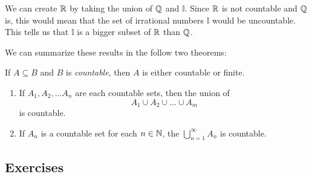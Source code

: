 We can create \( \mathbb{R} \) by taking the union of \( \mathbb{Q} \) and \( \mathbb{I} \). Since \( \mathbb{R} \) is not countable and \( \mathbb{Q} \) is, this would mean that the set of irrational numbers \( \mathbb{I}\) would be uncountable. This tells us that \( \mathbb{I}\) is a bigger subset of \( \mathbb{R} \) than \( \mathbb{Q} \). 

We can summarize these results in the follow two theorems: 


\begin{tcolorbox}
\begin{thm}
    If \( A \subseteq B \) and \( B \) is \textit{countable}, then \( A \) is either countable or finite. 
\end{thm}
\end{tcolorbox}

\begin{tcolorbox}
\begin{thm}
\begin{enumerate}
    \item If \( A_1, A_2,... A_n\) are each countable sets, then the union of 
        \[ A_1 \cup A_2 \cup ... \cup A_m \] is countable.
    \item If \( A_n \) is a countable set for each \( n \in \mathbb{N} \), the \( \bigcup_{n=1}^{\infty}A_n \) is countable. 
\end{enumerate}
\end{thm}
\end{tcolorbox}


\subsection{Exercises}
